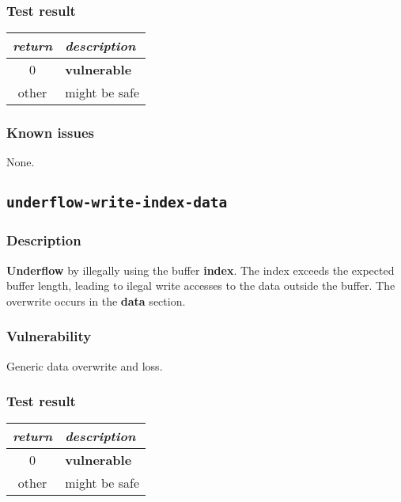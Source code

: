 \documentclass[a4paper]{book}
\begin{document}
\subsubsection{Test result}

\begin{tabular}{cl}
  \toprule
  \emph{return}  & \emph{description} \\
  \midrule
  0              & \textbf{vulnerable} \\
  other          & might be safe \\
  \bottomrule
\end{tabular}

\subsubsection{Known issues}

None.

\newpage

\subsection{\texttt{underflow-write-index-data}}\label{test-underflow-write-index-data}

\subsubsection{Description}

\textbf{Underflow} by illegally using the buffer \textbf{index}.
The index exceeds the expected buffer length,
leading to ilegal write accesses to the data outside the buffer.
The overwrite occurs in the \textbf{data} section.

\subsubsection{Vulnerability}
Generic data overwrite and loss.

\subsubsection{Test result}

\begin{tabular}{cl}
  \toprule
  \emph{return}  & \emph{description} \\
  \midrule
  0              & \textbf{vulnerable} \\
  other          & might be safe \\
  \bottomrule
\end{tabular}
\end{document}
